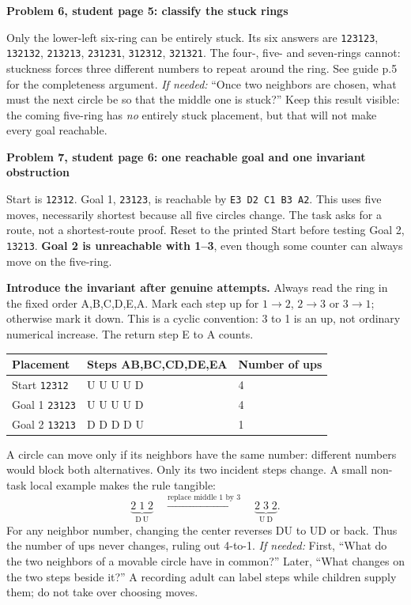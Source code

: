 \documentclass[10pt]{article}
\newcommand{\sub}[1]{\par\textbf{#1}\par}
\newcommand{\hint}[1]{\textit{If needed:} #1}
\newcommand{\word}[1]{\texttt{#1}}
\begin{document}
\sub{Problem 6, student page 5: classify the stuck rings}
Only the lower-left six-ring can be entirely stuck. Its six answers are \word{123123}, \word{132132}, \word{213213}, \word{231231}, \word{312312}, \word{321321}. The four-, five- and seven-rings cannot: stuckness forces three different numbers to repeat around the ring. See guide p.5 for the completeness argument. \hint{``Once two neighbors are chosen, what must the next circle be so that the middle one is stuck?''} Keep this result visible: the coming five-ring has \emph{no} entirely stuck placement, but that will not make every goal reachable.

\sub{Problem 7, student page 6: one reachable goal and one invariant obstruction}
Start is \word{12312}. Goal 1, \word{23123}, is reachable by \word{E3 D2 C1 B3 A2}. This uses five moves, necessarily shortest because all five circles change. The task asks for a route, not a shortest-route proof. Reset to the printed Start before testing Goal 2, \word{13213}. \textbf{Goal 2 is unreachable with 1--3}, even though some counter can always move on the five-ring.

\textbf{Introduce the invariant after genuine attempts.} Always read the ring in the fixed order A,B,C,D,E,A. Mark each step up for $1\to2$, $2\to3$ or $3\to1$; otherwise mark it down. This is a cyclic convention: 3 to 1 is an up, not ordinary numerical increase. The return step E to A counts.
\begin{center}\renewcommand{\arraystretch}{1.25}
\begin{tabular}{lll}
Placement & Steps AB,BC,CD,DE,EA & Number of ups\\\midrule
Start \word{12312} & U U U U D & 4\\
Goal 1 \word{23123} & U U U U D & 4\\
Goal 2 \word{13213} & D D D D U & 1\\
\end{tabular}\end{center}
A circle can move only if its neighbors have the same number: different numbers would block both alternatives. Only its two incident steps change. A small non-task local example makes the rule tangible:
\[
\underbrace{2\;1\;2}_{\mathrm{D\ U}}\quad
\xrightarrow{\text{replace middle 1 by 3}}\quad
\underbrace{2\;3\;2}_{\mathrm{U\ D}}.
\]
For any neighbor number, changing the center reverses DU to UD or back. Thus the number of ups never changes, ruling out 4-to-1. \hint{First, ``What do the two neighbors of a movable circle have in common?'' Later, ``What changes on the two steps beside it?''} A recording adult can label steps while children supply them; do not take over choosing moves.
\end{document}
